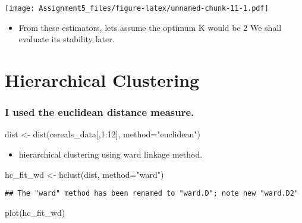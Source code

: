 \documentclass[
]{article}
\newenvironment{Shaded}{\begin{snugshade}}{\end{snugshade}}
\newcommand{\AttributeTok}[1]{\textcolor[rgb]{0.77,0.63,0.00}{#1}}
\newcommand{\DecValTok}[1]{\textcolor[rgb]{0.00,0.00,0.81}{#1}}
\newcommand{\FunctionTok}[1]{\textcolor[rgb]{0.00,0.00,0.00}{#1}}
\newcommand{\NormalTok}[1]{#1}
\newcommand{\OtherTok}[1]{\textcolor[rgb]{0.56,0.35,0.01}{#1}}
\newcommand{\SpecialCharTok}[1]{\textcolor[rgb]{0.00,0.00,0.00}{#1}}
\newcommand{\StringTok}[1]{\textcolor[rgb]{0.31,0.60,0.02}{#1}}
\providecommand{\tightlist}{%
  \setlength{\itemsep}{0pt}\setlength{\parskip}{0pt}}
\begin{document}
\texttt{[image: Assignment5\_files/figure-latex/unnamed-chunk-11-1.pdf]}

\begin{itemize}
\tightlist
\item
  From these estimators, lets assume the optimum K would be 2 We shall
  evaluate its stability later.
\end{itemize}

\hypertarget{hierarchical-clustering}{%
\section{Hierarchical Clustering}\label{hierarchical-clustering}}

\hypertarget{i-used-the-euclidean-distance-measure.}{%
\subsubsection{I used the euclidean distance
measure.}\label{i-used-the-euclidean-distance-measure.}}

\begin{Shaded}
\begin{Highlighting}[]
\NormalTok{dist }\OtherTok{\textless{}{-}} \FunctionTok{dist}\NormalTok{(cereals\_data[,}\DecValTok{1}\SpecialCharTok{:}\DecValTok{12}\NormalTok{], }\AttributeTok{method=}\StringTok{"euclidean"}\NormalTok{)}
\end{Highlighting}
\end{Shaded}

\begin{itemize}
\tightlist
\item
  hierarchical clustering using ward linkage method.
\end{itemize}

\begin{Shaded}
\begin{Highlighting}[]
\NormalTok{hc\_fit\_wd }\OtherTok{\textless{}{-}} \FunctionTok{hclust}\NormalTok{(dist, }\AttributeTok{method=}\StringTok{"ward"}\NormalTok{)}
\end{Highlighting}
\end{Shaded}

\begin{verbatim}
## The "ward" method has been renamed to "ward.D"; note new "ward.D2"
\end{verbatim}

\begin{Shaded}
\begin{Highlighting}[]
\FunctionTok{plot}\NormalTok{(hc\_fit\_wd)}
\end{Highlighting}
\end{Shaded}
\end{document}
